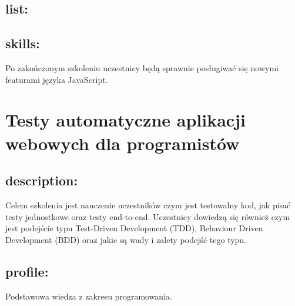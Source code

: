 \documentclass{article}[10pt]
\begin{document}
	\subsection*{list:}
\begin{adjustwidth}{1.5cm}{}
	\begin{itemize}
























	\end{itemize}
\end{adjustwidth}

	\subsection*{skills:}
\begin{adjustwidth}{2cm}{}
	
Po zakończonym szkoleniu uczestnicy będą sprawnie posługiwać się nowymi featurami języka JavaScript.
\end{adjustwidth}

\newpage


    
	\section{Testy automatyczne aplikacji webowych dla programistów
}

	\subsection*{description:}
	\begin{adjustwidth}{2cm}{}
		
Celem szkolenia jest nauczenie uczestników czym jest testowalny kod, jak pisać testy jednostkowe oraz testy end-to-end. Uczestnicy dowiedzą się również czym jest podejście typu Test-Driven Development (TDD),  Behaviour Driven Development (BDD) oraz jakie są wady i zalety podejść tego typu.

	\end{adjustwidth}
	\subsection*{profile:}
\begin{adjustwidth}{2cm}{}
	
Podstawowa wiedza z zakresu programowania.
\end{adjustwidth}
\end{document}

